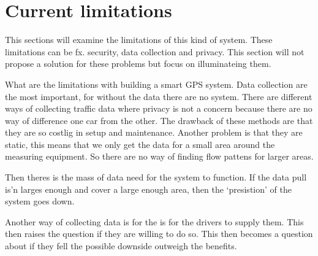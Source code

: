 \section{Current limitations}
This sections will examine the limitations of this kind of system. These limitations can be fx. security, data collection and privacy. This section will not propose a solution for these problems but focus on illuminateing them.
\newline

What are the limitations with building a smart GPS system. Data collection are the most important, for without the data there are no system. There are different ways of collecting traffic data where privacy is not a concern because there are no way of difference one car from the other. The drawback of these methods are that they are so costlig in setup and maintenance. Another problem is that they are static, this means that we only get the data for a small area around the measuring equipment. So there are no way of finding flow pattens for larger areas.

Then theres is the mass of data need for the system to function. If the data pull is'n larges enough and cover a large enough area, then the `presistion' of the system goes down.

Another way of collecting data is for the is for the drivers to supply them. This then raises the question if they are willing to do so. This then becomes a question about if they fell the possible downside outweigh the benefits.
